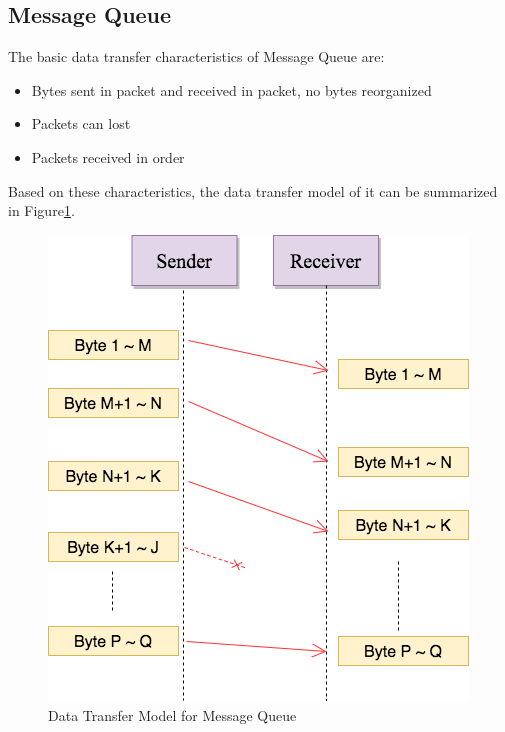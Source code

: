 \subsection{Message Queue}
The basic data transfer characteristics of Message Queue are:
\begin{itemize}
  \item Bytes sent in packet and received in packet, no bytes reorganized
  \item Packets can lost
  \item Packets received in order
\end{itemize}
Based on these characteristics, the data transfer model of it can be summarized in Figure\ref{msmq}.
\begin{figure}[H]
\centerline{\includegraphics[scale=0.48]{Figures/msmq}}
\caption{Data Transfer Model for Message Queue}
\label{msmq}
\end{figure}

